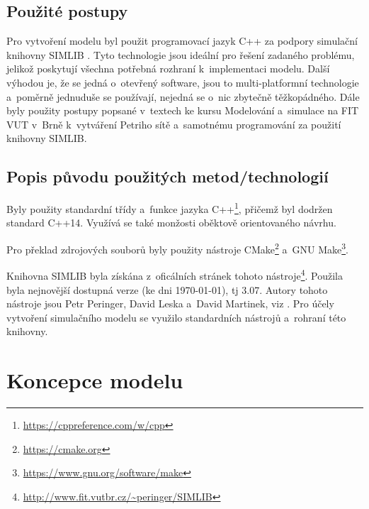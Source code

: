 \documentclass[a4paper, 11pt]{article}
\begin{document}
	\subsection{Použité postupy}

	Pro vytvoření modelu byl použit programovací jazyk C++ za podpory
	simulační knihovny SIMLIB \cite{SIMLIB}. Tyto technologie jsou ideální pro
	řešení zadaného problému, jelikož poskytují všechna potřebná rozhraní
	k~implementaci modelu. Další výhodou je, že se jedná o~otevřený software,
	jsou to multi-platformní technologie a~poměrně jednuduše se používají,
	nejedná se o~nic zbytečně těžkopádného. Dále byly použity postupy popsané
	v~textech ke kursu Modelování a~simulace na FIT VUT v~Brně \cite{IMS_slides}
	k~vytváření Petriho sítě \cite[snímek 123]{IMS_slides} a~samotnému
	programování za použití knihovny SIMLIB.


	\subsection{Popis původu použitých metod/technologií}

	Byly použity standardní třídy a~funkce jazyka
	C++\footnote{\url{https://cppreference.com/w/cpp}}, přičemž
	byl dodržen standard C++14. Využívá se také monžosti oběktově
	orientovaného návrhu.

	Pro překlad zdrojových souborů byly použity nástroje
	CMake\footnote{\url{https://cmake.org}}
	a~GNU Make\footnote{\url{https://www.gnu.org/software/make}}.

	Knihovna SIMLIB byla získána z~oficálních stránek tohoto
	nástroje\footnote{\url{http://www.fit.vutbr.cz/~peringer/SIMLIB}}.
	Použila byla nejnovější dostupná verze (ke dni \today), tj 3.07.
	Autory tohoto nástroje jsou Petr Peringer, David Leska a~David Martinek,
	viz \cite{SIMLIB}. Pro účely vytvoření simulačního modelu
	\cite[snímek 44]{IMS_slides} se využilo standardních nástrojů
	a~rohraní této knihovny.



	\section{Koncepce modelu}
\end{document}
